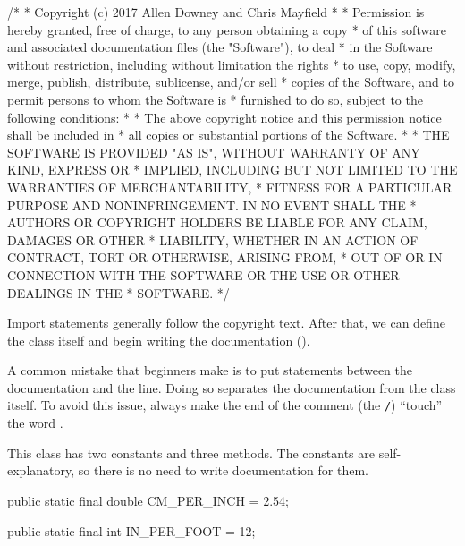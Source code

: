 \begin{scriptsize}
\begin{code}
/*
 * Copyright (c) 2017 Allen Downey and Chris Mayfield
 *
 * Permission is hereby granted, free of charge, to any person obtaining a copy
 * of this software and associated documentation files (the "Software"), to deal
 * in the Software without restriction, including without limitation the rights
 * to use, copy, modify, merge, publish, distribute, sublicense, and/or sell
 * copies of the Software, and to permit persons to whom the Software is
 * furnished to do so, subject to the following conditions:
 *
 * The above copyright notice and this permission notice shall be included in
 * all copies or substantial portions of the Software.
 *
 * THE SOFTWARE IS PROVIDED "AS IS", WITHOUT WARRANTY OF ANY KIND, EXPRESS OR
 * IMPLIED, INCLUDING BUT NOT LIMITED TO THE WARRANTIES OF MERCHANTABILITY,
 * FITNESS FOR A PARTICULAR PURPOSE AND NONINFRINGEMENT. IN NO EVENT SHALL THE
 * AUTHORS OR COPYRIGHT HOLDERS BE LIABLE FOR ANY CLAIM, DAMAGES OR OTHER
 * LIABILITY, WHETHER IN AN ACTION OF CONTRACT, TORT OR OTHERWISE, ARISING FROM,
 * OUT OF OR IN CONNECTION WITH THE SOFTWARE OR THE USE OR OTHER DEALINGS IN THE
 * SOFTWARE.
 */
\end{code}
\end{scriptsize}

Import statements generally follow the copyright text.
After that, we can define the class itself and begin writing the documentation (\java{/**}).

\begin{code}
import java.util.Scanner;

/**
 * Methods for converting to/from the metric system.
 *
 * @author Allen Downey
 * @author Chris Mayfield
 * @version 6.1.5
 */
public class Convert {
\end{code}

A common mistake that beginners make is to put  statements between the documentation and the  line.
Doing so separates the documentation from the class itself.
To avoid this issue, always make the end of the comment (the \textcolor{comment}{\tt */}) ``touch'' the word .


This class has two constants and three methods.
The constants are self-explanatory, so there is no need to write documentation for them.

\begin{code}
    public static final double CM_PER_INCH = 2.54;

    public static final int IN_PER_FOOT = 12;
\end{code}

